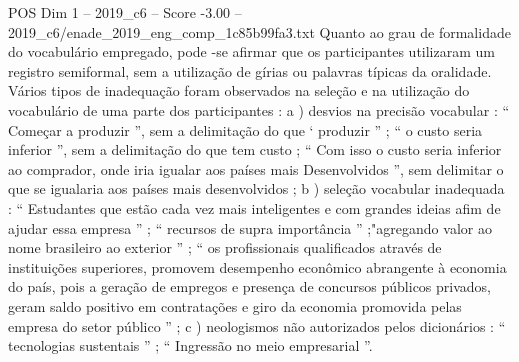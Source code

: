 \begin{textsample}{POS Dim 1 – 2019\_c6 – Score -3.00 – 2019\_c6/enade\_2019\_eng\_comp\_1c85b99fa3.txt}
Quanto ao grau de formalidade do vocabulário empregado, pode -se afirmar que os participantes utilizaram um registro semiformal, sem a utilização de gírias ou palavras típicas da oralidade.
Vários tipos de inadequação foram observados na seleção e na utilização do vocabulário de uma parte dos participantes : a ) desvios na precisão vocabular : “ Começar a produzir ”, sem a delimitação do que ‘ produzir ” ; “ o custo seria inferior ”, sem a delimitação do que tem custo ; “ Com isso o custo seria inferior ao comprador, onde iria igualar aos países mais Desenvolvidos ”, sem delimitar o que se igualaria aos países mais desenvolvidos ; b ) seleção vocabular inadequada : “ Estudantes que estão cada vez mais inteligentes e com grandes ideias afim de ajudar essa empresa ” ; “ recursos de supra importância ” ;"agregando valor ao nome brasileiro ao exterior ” ; “ os profissionais qualificados através de instituições superiores, promovem desempenho econômico abrangente à economia do país, pois a geração de empregos e presença de concursos públicos privados, geram saldo positivo em contratações e giro da economia promovida pelas empresa do setor público ” ; c ) neologismos não autorizados pelos dicionários : “ tecnologias sustentais ” ; “ Ingressão no meio empresarial ”.

\end{textsample}
